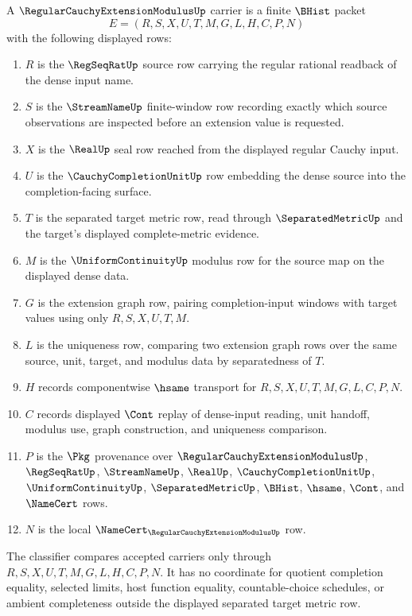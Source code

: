 \begin{definition}
\label{def:regular-cauchy-extension-modulus-carrier}
A $\RegularCauchyExtensionModulusUp$ carrier is a finite $\BHist$ packet
$$
E=(R,S,X,U,T,M,G,L,H,C,P,N)
$$
with the following displayed rows:
\begin{enumerate}
\item $R$ is the $\RegSeqRatUp$ source row carrying the regular rational readback of the dense input name.
\item $S$ is the $\StreamNameUp$ finite-window row recording exactly which source observations are inspected before an extension value is requested.
\item $X$ is the $\RealUp$ seal row reached from the displayed regular Cauchy input.
\item $U$ is the $\CauchyCompletionUnitUp$ row embedding the dense source into the completion-facing surface.
\item $T$ is the separated target metric row, read through $\SeparatedMetricUp$ and the target's displayed complete-metric evidence.
\item $M$ is the $\UniformContinuityUp$ modulus row for the source map on the displayed dense data.
\item $G$ is the extension graph row, pairing completion-input windows with target values using only $R,S,X,U,T,M$.
\item $L$ is the uniqueness row, comparing two extension graph rows over the same source, unit, target, and modulus data by separatedness of $T$.
\item $H$ records componentwise $\hsame$ transport for $R,S,X,U,T,M,G,L,C,P,N$.
\item $C$ records displayed $\Cont$ replay of dense-input reading, unit handoff, modulus use, graph construction, and uniqueness comparison.
\item $P$ is the $\Pkg$ provenance over $\RegularCauchyExtensionModulusUp$, $\RegSeqRatUp$, $\StreamNameUp$, $\RealUp$, $\CauchyCompletionUnitUp$, $\UniformContinuityUp$, $\SeparatedMetricUp$, $\BHist$, $\hsame$, $\Cont$, and $\NameCert$ rows.
\item $N$ is the local $\NameCert_{\RegularCauchyExtensionModulusUp}$ row.
\end{enumerate}
The classifier compares accepted carriers only through $R,S,X,U,T,M,G,L,H,C,P,N$. It has no coordinate for quotient completion equality, selected limits, host function equality, countable-choice schedules, or ambient completeness outside the displayed separated target metric row.
\end{definition}

